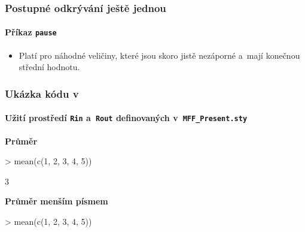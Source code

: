 \documentclass[c, 10pt]{beamer}
\begin{document}
\begin{frame}\frametitle{Postupné odkrývání ještě jednou}
\framesubtitle{Příkaz \texttt{pause}}


\pause
\vspace{2em}
\begin{itemize}
\item Platí pro náhodné veličiny, které jsou skoro jistě nezáporné a~mají konečnou střední hodnotu.
\end{itemize}

\end{frame}

\begin{frame}[fragile]\frametitle{Ukázka kódu v~{\Rko}}   %
\framesubtitle{Užití prostředí \texttt{Rin} a~\texttt{Rout} definovaných v~\texttt{MFF\_{}Present.sty}}

\alert{\bfseries Průměr}
\begin{Rin}
> mean(c(1, 2, 3, 4, 5))
\end{Rin}

\medskip
\begin{Rout}
[1] 3
\end{Rout}

\medskip
\alert{\bfseries Průměr menším písmem}
\begin{Rin}[fontsize=\scriptsize]
> mean(c(1, 2, 3, 4, 5))
\end{Rin}
\end{frame}
\end{document}

